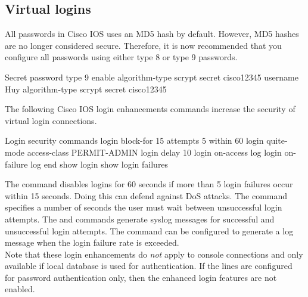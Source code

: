 \subsection{Virtual logins}

All passwords in Cisco IOS uses an MD5 hash by default. However, MD5 hashes are no longer considered secure. Therefore, it is now recommended that you configure all passwords using either type 8  or type 9  passwords.

\begin{sexylisting}{Secret password type 9}
enable algorithm-type scrypt secret cisco12345
username Huy algorithm-type scrypt secret cisco12345
\end{sexylisting}

The following Cisco IOS login enhancements commands increase the security of virtual login connections.

\begin{sexylisting}{Login security commands}
login block-for 15 attempts 5 within 60
login quite-mode access-class PERMIT-ADMIN
login delay 10
login on-access log
login on-failure log
end
show login
show login failures
\end{sexylisting}

The  command disables logins for 60 seconds if more than 5 login failures occur within 15 seconds. Doing this can defend against DoS attacks. The  command specifies a number of seconds the user must wait between unsuccessful login attempts. The  and  commands generate syslog messages for successful and unsuccessful login attempts. The  command can be configured to generate a log message when the login failure rate is exceeded.\\

Note that these login enhancements do \emph{not} apply to console connections and only available if local database is used for authentication. If the lines are configured for password authentication only, then the enhanced login features are not enabled.

%
%

